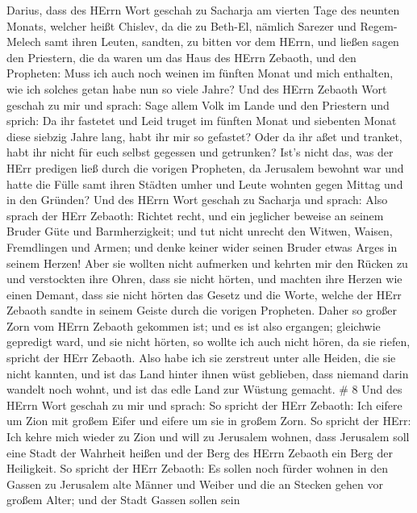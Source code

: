 Darius, dass des HErrn Wort geschah zu Sacharja am vierten Tage des
neunten Monats, welcher heißt Chislev,  da die zu Beth-El,
nämlich Sarezer und Regem-Melech samt ihren Leuten, sandten, zu bitten
vor dem HErrn,  und ließen sagen den Priestern, die da waren
um das Haus des HErrn Zebaoth, und den Propheten: Muss ich auch noch
weinen im fünften Monat und mich enthalten, wie ich solches getan habe
nun so viele Jahre?  Und des HErrn Zebaoth Wort geschah zu
mir und sprach:  Sage allem Volk im Lande und den Priestern
und sprich: Da ihr fastetet und Leid truget im fünften Monat und
siebenten Monat diese siebzig Jahre lang, habt ihr mir so gefastet?
 Oder da ihr aßet und tranket, habt ihr nicht für euch
selbst gegessen und getrunken?  Ist's nicht das, was der
HErr predigen ließ durch die vorigen Propheten, da Jerusalem bewohnt war
und hatte die Fülle samt ihren Städten umher und Leute wohnten gegen
Mittag und in den Gründen?  Und des HErrn Wort geschah zu
Sacharja und sprach:  Also sprach der HErr Zebaoth: Richtet
recht, und ein jeglicher beweise an seinem Bruder Güte und
Barmherzigkeit;  und tut nicht unrecht den Witwen, Waisen,
Fremdlingen und Armen; und denke keiner wider seinen Bruder etwas Arges
in seinem Herzen!  Aber sie wollten nicht aufmerken und
kehrten mir den Rücken zu und verstockten ihre Ohren, dass sie nicht
hörten,  und machten ihre Herzen wie einen Demant, dass sie
nicht hörten das Gesetz und die Worte, welche der HErr Zebaoth sandte in
seinem Geiste durch die vorigen Propheten. Daher so großer Zorn vom
HErrn Zebaoth gekommen ist;  und es ist also ergangen;
gleichwie gepredigt ward, und sie nicht hörten, so wollte ich auch nicht
hören, da sie riefen, spricht der HErr Zebaoth.  Also habe
ich sie zerstreut unter alle Heiden, die sie nicht kannten, und ist das
Land hinter ihnen wüst geblieben, dass niemand darin wandelt noch wohnt,
und ist das edle Land zur Wüstung gemacht. \# 8  Und des
HErrn Wort geschah zu mir und sprach:  So spricht der HErr
Zebaoth: Ich eifere um Zion mit großem Eifer und eifere um sie in großem
Zorn.  So spricht der HErr: Ich kehre mich wieder zu Zion
und will zu Jerusalem wohnen, dass Jerusalem soll eine Stadt der
Wahrheit heißen und der Berg des HErrn Zebaoth ein Berg der Heiligkeit.
 So spricht der HErr Zebaoth: Es sollen noch fürder wohnen
in den Gassen zu Jerusalem alte Männer und Weiber und die an Stecken
gehen vor großem Alter;  und der Stadt Gassen sollen sein
